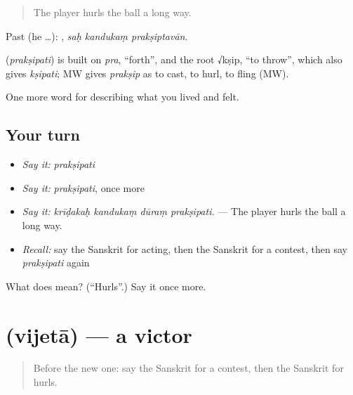 \begin{quote}
The player hurls the ball a long way.
\end{quote}

Past (he …):   , \emph{saḥ kandukaṃ prakṣiptavān}.

\begin{cousinweb}
\textbf{} (\emph{prakṣipati}) is built on \emph{pra}, \textquotedblleft{}forth\textquotedblright{}, and the root √kṣip, \textquotedblleft{}to throw\textquotedblright{}, which also gives \emph{kṣipati}; MW gives \emph{prakṣip} as to cast, to hurl, to fling (MW).
\end{cousinweb}

\begin{grammarlens}[title={What you've built}]
One more word for describing what you lived and felt.
\end{grammarlens}

\subsection*{Your turn}
\begin{itemize}
\raggedright
  \item \emph{Say it:} \emph{prakṣipati}
  \item \emph{Say it:} \emph{prakṣipati}, once more
  \item \emph{Say it:} \emph{krīḍakaḥ kandukaṃ dūraṃ prakṣipati.} — The player hurls the ball a long way.
  \item \emph{Recall:} say the Sanskrit for acting, then the Sanskrit for a contest, then say \emph{prakṣipati} again
\end{itemize}

\begin{tcolorbox}[breakable,colback=teal!4,colframe=teal!35!black,title={Before you move on}]
What does  mean? (\textquotedblleft{}Hurls\textquotedblright{}.) Say it once more.
\end{tcolorbox}
\section[\texorpdfstring{\sk{विजेता} (vijetā)}{विजेता (vijetā)}]{ (vijetā) — a victor}

\label{lesson:SA-C524-vijeta}



\begin{quote}
Before the new one: say the Sanskrit for a contest, then the Sanskrit for hurls.
\end{quote}

